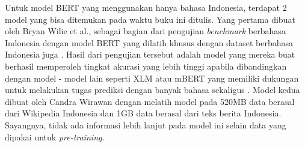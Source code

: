 Untuk model BERT yang menggunakan hanya bahasa Indonesia, terdapat 2 model yang bisa ditemukan pada waktu buku ini ditulis. Yang pertama dibuat oleh Bryan Wilie et al., sebagai bagian dari pengujian \textit{benchmark} berbahasa Indonesia dengan model BERT yang dilatih khusus dengan dataset berbahasa Indonesia juga \cite{wilie2020indonlu}. Hasil dari pengujian tersebut adalah model yang mereka buat berhasil memperoleh tingkat akurasi yang lebih tinggi apabila dibandingkan dengan model - model lain seperti XLM atau mBERT yang memiliki dukungan untuk melakukan tugas prediksi dengan banyak bahasa sekaligus \cite{wilie2020indonlu}. Model kedua dibuat oleh Candra Wirawan dengan melatih model pada 520MB data berasal dari Wikipedia Indonesia dan 1GB data berasal dari teks berita Indonesia. Sayangnya, tidak ada informasi lebih lanjut pada model ini selain data yang dipakai untuk \textit{pre-training}.